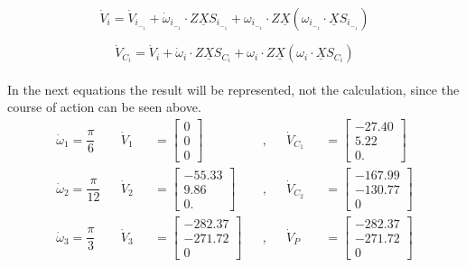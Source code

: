 \begin{equation}
\dot{V}_i=\dot{V}_i_-_1+\dot\omega_i_-_1\cdot Z\underline{X}S_i_-_1+\omega_i_-_1\cdot Z\underline{X}(\omega_i_-_1\cdot\underline{X}S_i_-_1)
\end{equation}

\begin{equation}
\dot{V}_C_i=\dot{V}_i+\dot\omega_i\cdot Z\underline{X}S_C_i+\omega_i\cdot Z\underline{X}(\omega_i\cdot\underline{X}S_C_i)
\end{equation}
\\
In the next equations the result will be represented, not the calculation, since the course of action can be seen above.\\

\begin{align}
\dot\omega_1=\dfrac{\pi}{6}&&
    \dot{V}_1&&=
\left[\begin{matrix}
    0\\
    0\\
    0
\end{matrix}\right]&&,&&\dot{V}_C_1&&=\left[\begin{matrix}
    -27.40\\
    5.22\\
    0.
\end{matrix}\right]\\
\dot\omega_2=\dfrac{\pi}{12}&&
    \dot{V}_2&&=
\left[\begin{matrix}
    -55.33\\
    9.86\\
    0.
\end{matrix}\right]&&,&& \dot{V}_C_2&&=
\left[\begin{matrix}
   -167.99 \\
   -130.77\\
    0
\end{matrix}\right]\\
\dot\omega_3=\dfrac{\pi}{3}&&
    \Dot{V}_3&&=
\left[\begin{matrix}
    -282.37\\
    -271.72\\
    0
\end{matrix}\right]&&,&& \dot{V}_P&&=\left[\begin{matrix}
    -282.37\\
    -271.72\\
    0
\end{matrix}\right]
\end{align}
\\
\noindent
